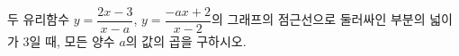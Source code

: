 두 유리함수 $y=\dfrac{2x-3}{x-a}$, $y=\dfrac{-ax+2}{x-2}$의 그래프의 점근선으로 둘러싸인 부분의 넓이가 $3$일 때, 모든 양수 $a$의 값의 곱을 구하시오.
